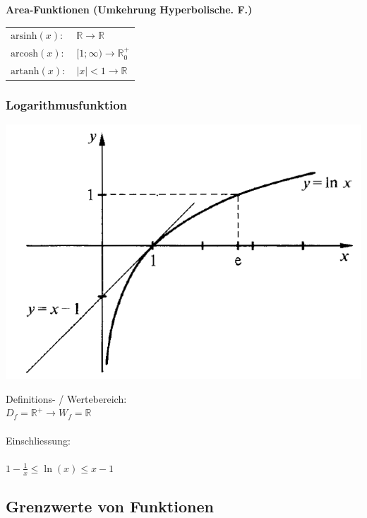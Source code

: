 			\textbf{Area-Funktionen (Umkehrung Hyperbolische. F.)} \\
				\begin{tabular}{ll}
					$\mathrm{arsinh}(x): $ &  $\mathbb{R} \rightarrow \mathbb{R}$ \\
					$\mathrm{arcosh}(x): $ & $[1; \infty) \rightarrow \mathbb{R}^+_0$  \\
					$\mathrm{artanh}(x): $ & $ \vert x \vert < 1 \rightarrow \mathbb{R} $ \\			
				\end{tabular}
			
		\subsubsection{Logarithmusfunktion}
				
			\begin{minipage}{.45\linewidth}
				\includegraphics[width=0.95\linewidth]{Bilder/ln-funktion}
			\end{minipage}
				\hfill
			\begin{minipage}{.5\linewidth}
				Definitions- / Wertebereich: \\
				$D_f = \mathbb{R^+} \rightarrow W_f = \mathbb{R}$ \\
				\\
				Einschliessung: \\
				\\
				$1-\frac{1}{x} \leq \ln(x) \leq x-1$
			\end{minipage}
				
	\subsection{Grenzwerte von Funktionen}
			
